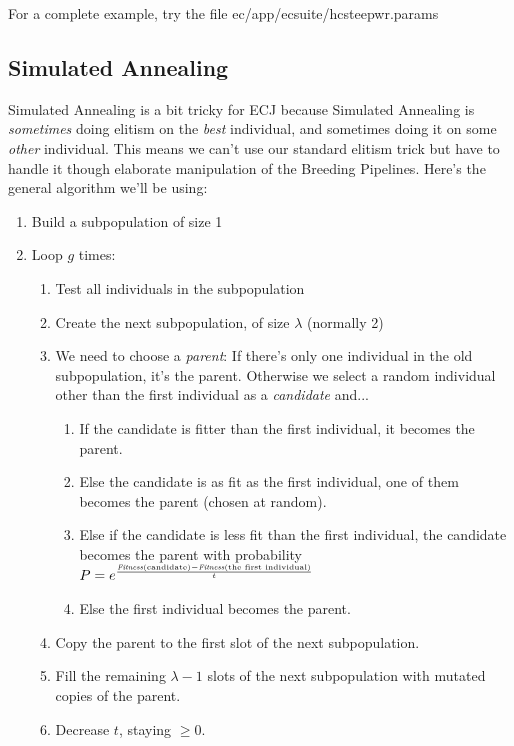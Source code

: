 \documentclass[twoside,10pt]{book}
\newcommand\file[1]{\index{#1}\textsf{#1}}
\begin{document}
For a complete example, try the file \file{ec/app/ecsuite/hcsteepwr.params}



\subsection{Simulated Annealing}

Simulated Annealing is a bit tricky for ECJ because Simulated Annealing is {\it sometimes} doing elitism on the {\it best} individual, and sometimes doing it on some {\it other} individual.  This means we can't use our standard elitism trick but have to handle it though elaborate manipulation of the Breeding Pipelines.  Here's the general algorithm we'll be using:

\begin{enumerate}
\item Build a subpopulation of size 1
\item Loop \(g\) times:
	\begin{enumerate}
		\item Test all individuals in the subpopulation
		\item Create the next subpopulation, of size \(\lambda\) (normally 2)
		\item We need to choose a {\it parent}: If there's only one individual in the old subpopulation, it's the parent.  Otherwise we select a random individual other than the first individual as a {\it candidate} and...
			\begin{enumerate}
			\item If the candidate is fitter than the first individual, it becomes the parent.
			\item Else the candidate is as fit as the first individual, one of them becomes the parent (chosen at random).
			\item Else if the candidate is less fit than the first individual, the candidate becomes the parent with probability \(P=e^\frac{\text{{\it Fitness}(candidate)} - \text{{\it Fitness}(the first individual)}}{t}\)	
			\item Else the first individual becomes the parent.
			\end{enumerate}
		\item Copy the parent to the first slot of the next subpopulation.
		\item Fill the remaining \(\lambda-1\) slots of the next subpopulation with mutated copies of the parent.
	\item Decrease \(t\), staying \(\geq 0\).
	\end{enumerate}
\end{enumerate}
\end{document}

